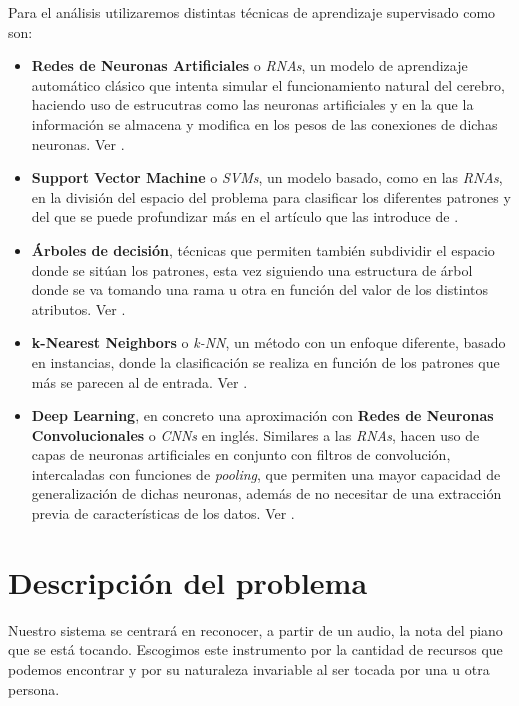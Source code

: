 \documentclass[12pt]{article}
\begin{document}
\bigskip
Para el análisis utilizaremos distintas técnicas de aprendizaje supervisado como son:
\begin{itemize}
	\item \textbf{Redes de Neuronas Artificiales} o \textit{RNAs}, un modelo de aprendizaje automático clásico que
	intenta simular el funcionamiento natural del cerebro, haciendo uso de estrucutras como las neuronas artificiales y en la que
	la información se almacena y modifica en los pesos de las conexiones de dichas neuronas. Ver \cite{krogh2008artificial}.
	\item \textbf{Support Vector Machine} o \textit{SVMs}, un modelo basado, como en las \textit{RNAs}, en la división del espacio del problema para clasificar
	los diferentes patrones y del que se puede profundizar más en el artículo que las introduce de \cite{cortes1995support}.
	\item \textbf{Árboles de decisión}, técnicas que permiten también subdividir el espacio donde se sitúan los patrones, esta vez
	siguiendo una estructura de árbol donde se va tomando una rama u otra en función del valor de los distintos atributos. Ver \cite{myles2004introduction}.
	\item \textbf{k-Nearest Neighbors} o \textit{k-NN}, un método con un enfoque diferente, basado en instancias, donde la clasificación
	se realiza en función de los patrones que más se parecen al de entrada. Ver \cite{guo2003knn}.
	\item \textbf{Deep Learning}, en concreto una aproximación con \textbf{Redes de Neuronas Convolucionales} o \textit{CNNs} en inglés.
	Similares a las \textit{RNAs}, hacen uso de capas de neuronas artificiales en conjunto con filtros de convolución, intercaladas con funciones de 
	\textit{pooling}, que permiten una mayor capacidad de generalización de dichas neuronas, además de no necesitar de una extracción previa de 
	características de los datos. Ver \cite{indolia2018679}.
\end{itemize}
\newpage

\section{Descripción del problema}
\label{Descripción del problema}

Nuestro sistema se centrará en reconocer, a partir de un audio, la nota del piano que se está tocando. Escogimos este instrumento por la cantidad de recursos
que podemos encontrar y por su naturaleza invariable al ser tocada por una u otra persona.
\end{document}
